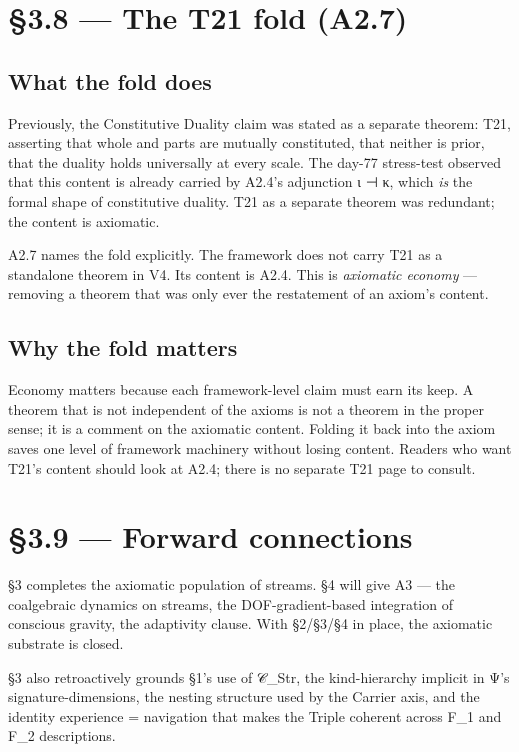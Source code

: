 \documentclass[11pt, openany]{book}
\newcommand{\sectionbreak}{\clearpage}
\begin{document}
\section{§3.8 --- The T21 fold (A2.7)}

\subsection{What the fold does}

Previously, the Constitutive Duality claim was stated as a separate theorem: T21, asserting that whole and parts are mutually constituted, that neither is prior, that the duality holds universally at every scale. The day-77 stress-test observed that this content is already carried by A2.4's adjunction ι ⊣ κ, which \textit{is} the formal shape of constitutive duality. T21 as a separate theorem was redundant; the content is axiomatic.

A2.7 names the fold explicitly. The framework does not carry T21 as a standalone theorem in V4. Its content is A2.4. This is \textit{axiomatic economy} --- removing a theorem that was only ever the restatement of an axiom's content.

\subsection{Why the fold matters}

Economy matters because each framework-level claim must earn its keep. A theorem that is not independent of the axioms is not a theorem in the proper sense; it is a comment on the axiomatic content. Folding it back into the axiom saves one level of framework machinery without losing content. Readers who want T21's content should look at A2.4; there is no separate T21 page to consult.

\sectionbreak

\section{§3.9 --- Forward connections}

§3 completes the axiomatic population of streams. §4 will give A3 --- the coalgebraic dynamics on streams, the DOF-gradient-based integration of conscious gravity, the adaptivity clause. With §2/§3/§4 in place, the axiomatic substrate is closed.

§3 also retroactively grounds §1's use of 𝒞\_\allowbreak{}Str, the kind-hierarchy implicit in Ψ's signature-dimensions, the nesting structure used by the Carrier axis, and the identity experience = navigation that makes the Triple coherent across F\_\allowbreak{}1 and F\_\allowbreak{}2 descriptions.
\end{document}
